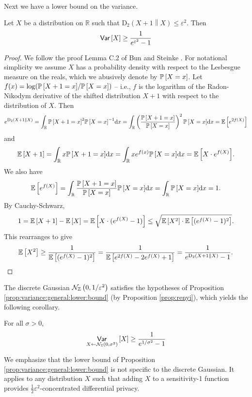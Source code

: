 \documentclass{jpc}
\newcommand{\dgausss}[2]{{\discN\left(#1,#2\right)}}
\newcommand{\dgauss}[1]{\dgausss{0}{#1}}
\newcommand{\ex}[2]{{\ifx&#1& \mathbb{E} \else
\underset{#1}{\mathbb{E}} \fi \left[#2\right]}}
\newcommand{\pr}[2]{{\ifx&#1& \mathbb{P} \else
\underset{#1}{\mathbb{P}} \fi \left[#2\right]}}
\newcommand{\var}[2]{{\ifx&#1& \mathsf{Var} \else
\underset{#1}{\mathsf{Var}} \fi \left[#2\right]}}
\newcommand{\dr}[3]{\mathrm{D}_{#1}\left(#2\middle\|#3\right)}
\newcommand{\R}{\mathbb{R}}
\begin{document}
Next we have a lower bound on the variance. 

\begin{prop}\label{prop:variance:general:lower:bound}
Let $X$ be a distribution on $\R$ such that $\dr{2}{X+1}{X} \le \varepsilon^2$. Then
\begin{equation}
    \var{}{X} \geq \frac{1}{e^{\varepsilon^2}-1}
\end{equation}
\end{prop}
\begin{proof}
We follow the proof Lemma C.2 of Bun and Steinke \cite{BunS16}. For notational simplicity we assume $X$ has a probability density with respect to the Lesbesgue measure on the reals, which we abusively denote by $\pr{}{X=x}$. Let $f(x)=\log(\pr{}{X+1=x}/\pr{}{X=x})$ -- i.e., $f$ is the logarithm of the Radon-Nikodym derivative of the shifted distribution $X+1$ with respect to the distribution of $X$. Then $$e^{\dr{2}{X+1}{X}} = \int_\R \pr{}{X+1=x}^2 \pr{}{X=x}^{-1} \mathrm{d}x = \int_\R \left(\frac{\pr{}{X+1=x}}{\pr{}{X=x}}\right)^2 \pr{}{X=x} \mathrm{d}x = \ex{}{e^{2f(X)}}$$
and $$\ex{}{X+1} = \int_\R x \pr{}{X+1=x} \mathrm{d}x = \int_\R x e^{f(x)} \pr{}{X=x} \mathrm{d}x = \ex{}{X \cdot e^{f(X)}}.$$
We also have $$\ex{}{e^{f(X)}} = \int_\R \frac{\pr{}{X+1=x}}{\pr{}{X=x}} \pr{}{X=x} \mathrm{d}x = \int_\R \pr{}{X=x} \mathrm{d}x = 1.$$
By Cauchy-Schwarz, $$1=\ex{}{X+1}-\ex{}{X} = \ex{}{X \cdot (e^{f(X)}-1)} \le \sqrt{\ex{}{X^2} \cdot \ex{}{(e^{f(X)}-1)^2}}.$$
This rearranges to give
$$\ex{}{X^2} \ge \frac{1}{\ex{}{(e^{f(X)}-1)^2}} = \frac{1}{\ex{}{e^{2f(X)}-2e^{f(X)}+1}}=\frac{1}{e^{\dr{2}{X+1}{X}}-1}.$$
\end{proof}

The discrete Gaussian $\dgauss{1/\varepsilon^2}$ satisfies the hypotheses of Proposition \ref{prop:variance:general:lower:bound} (by Proposition \ref{prop:renyi}), which yields the following corollary.
\begin{cor}\label{cor:dgauss_var}
For all $\sigma>0$, 
\begin{equation}
    \var{X \gets \dgauss{\sigma^2}}{X} \ge \frac{1}{e^{1/\sigma^2}-1}
\end{equation}
\end{cor}
We emphasize that the lower bound of Proposition \ref{prop:variance:general:lower:bound} is not specific to the discrete Gaussian. It applies to any distribution $X$ such that adding $X$ to a sensitivity-1 function provides $\frac12\varepsilon^2$-concentrated differential privacy.
\end{document}
